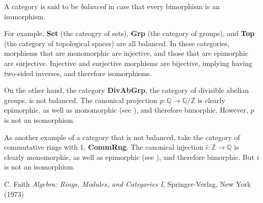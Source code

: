 \documentclass[12pt]{article}
\begin{document}
A category is said to be \emph{balanced} in case that every bimorphism is an isomorphism.

For example, \textbf{Set} (the cateogry of sets), \textbf{Grp} (the category of groups), and \textbf{Top} (the category of topological spaces) are all balanced.  In these categories, morphisms that are monomorphic are injective, and those that are epimorphic are surjective.  Injective and surjective morphisms are bijective, implying having two-sided inverses, and therefore isomorphisms.

On the other hand, the category \textbf{DivAbGrp}, the category of divisible abelian groups, is not balanced.  The canonical projection $p:\mathbb{Q}\to \mathbb{Q/Z}$ is clearly epimorphic, as well as monomorphic (see ), and therefore bimorphic.  However, $p$ is not an isomorphism. 

As another example of a category that is not balanced, take the category of commutative rings with 1, \textbf{CommRng}.  The canonical injection $i:\mathbb{Z}\to \mathbb{Q}$ is clearly monomorphic, as well as epimorphic (see ), and therefore bimorphic.  But $i$ is not an isomorphism.

\begin{thebibliography}{9}
 C. Faith \emph{Algebra: Rings, Modules, and Categories I}, Springer-Verlag, New York (1973)
\end{thebibliography}
\end{document}
